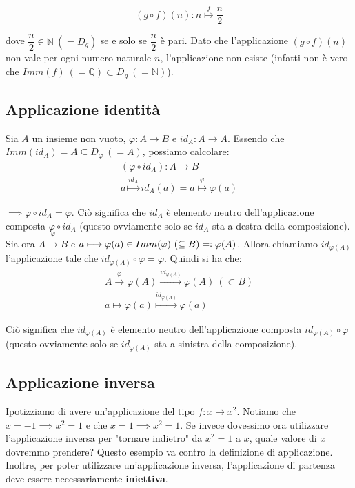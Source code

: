 \documentclass{article}
\begin{document}
\begin{equation*}
    (g \circ f)(n): n \overset{f}{\longmapsto} \frac{n}{2}
\end{equation*}

\noindent dove $\dfrac{n}{2} \in \mathbb{N} \ (= D_g)$ se e solo se $\dfrac{n}{2}$ è pari. Dato che l'applicazione $(g \circ f)(n)$ non vale per ogni numero naturale $n$, l'applicazione non esiste (infatti non è vero che $Imm(f) \ (= \mathbb{Q}) \subset D_g \ (= \mathbb{N})$).

\subsection{Applicazione identità}
Sia $A$ un insieme non vuoto, $\varphi: A \xrightarrow{} B$ e $id_A: A \xrightarrow{} A$. Essendo che $Imm(id_A) = A \subseteq D_\varphi \ (= A)$, possiamo calcolare:
\begin{gather*}
    (\varphi \circ id_A): A \xrightarrow{} B\\
    a \overset{id_A}{\longmapsto} id_A(a) = a \overset{\varphi}{\longmapsto} \varphi(a)
\end{gather*}

\noindent $\implies \varphi \circ id_A = \varphi$. Ciò significa che $id_A$ è elemento neutro dell'applicazione composta $\varphi \circ id_A$ (questo ovviamente solo se $id_A$ sta a destra della composizione).\\

\noindent Sia ora $A \overset{\varphi}{\xrightarrow{}} B$ e $a \longmapsto \varphi(a) \in Imm(\varphi) \ (\subseteq B) = \vcentcolon \varphi(A)$. Allora chiamiamo $id_{\varphi(A)}$ l'applicazione tale che $id_{\varphi(A)} \circ \varphi = \varphi$. Quindi si ha che:
\begin{gather*}
    A \overset{\varphi}{\longrightarrow} \varphi(A) \overset{id_{\varphi(A)}}{\longrightarrow} \varphi(A) \ (\subset B) \\
    a \longmapsto \varphi(a) \overset{id_{\varphi(A)}}{\longmapsto} \varphi(a)
\end{gather*}

\noindent Ciò significa che $id_{\varphi(A)}$ è elemento neutro dell'applicazione composta $id_{\varphi(A)} \circ \varphi$ (questo ovviamente solo se $id_{\varphi(A)}$ sta a sinistra della composizione).\\

\subsection{Applicazione inversa}
Ipotizziamo di avere un'applicazione del tipo $f: x \longmapsto x^2$. Notiamo che $x = -1 \implies x^2 = 1$ e che $x = 1 \implies x^2 = 1$. Se invece dovessimo ora utilizzare l'applicazione inversa per "tornare indietro" da $x^2 = 1$ a $x$, quale valore di $x$ dovremmo prendere? Questo esempio va contro la definizione di applicazione. Inoltre, per poter utilizzare un'applicazione inversa, l'applicazione di partenza deve essere necessariamente \textbf{iniettiva}.\\
\end{document}
